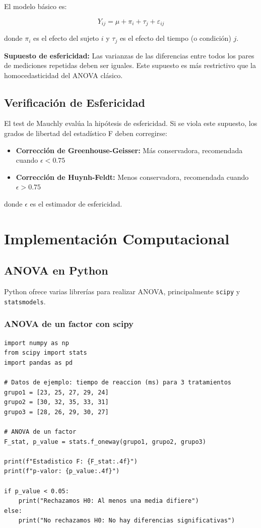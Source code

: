 \documentclass[11pt,a4paper]{article}
\theoremstyle{definition}
\begin{document}
El modelo básico es:

\begin{equation}
Y_{ij} = \mu + \pi_i + \tau_j + \varepsilon_{ij}
\end{equation}

donde $\pi_i$ es el efecto del sujeto $i$ y $\tau_j$ es el efecto del tiempo (o condición) $j$.

\textbf{Supuesto de esfericidad:} Las varianzas de las diferencias entre todos los pares de mediciones repetidas deben ser iguales. Este supuesto es más restrictivo que la homocedasticidad del ANOVA clásico.

\subsection{Verificación de Esfericidad}

El test de Mauchly evalúa la hipótesis de esfericidad. Si se viola este supuesto, los grados de libertad del estadístico F deben corregirse:

\begin{itemize}
    \item \textbf{Corrección de Greenhouse-Geisser:} Más conservadora, recomendada cuando $\epsilon < 0.75$
    \item \textbf{Corrección de Huynh-Feldt:} Menos conservadora, recomendada cuando $\epsilon > 0.75$
\end{itemize}

donde $\epsilon$ es el estimador de esfericidad.

\section{Implementación Computacional}

\subsection{ANOVA en Python}

Python ofrece varias librerías para realizar ANOVA, principalmente \texttt{scipy} y \texttt{statsmodels}.

\subsubsection{ANOVA de un factor con scipy}

\begin{lstlisting}[style=python, caption=ANOVA de un factor en Python]
import numpy as np
from scipy import stats
import pandas as pd

# Datos de ejemplo: tiempo de reaccion (ms) para 3 tratamientos
grupo1 = [23, 25, 27, 29, 24]
grupo2 = [30, 32, 35, 33, 31]
grupo3 = [28, 26, 29, 30, 27]

# ANOVA de un factor
F_stat, p_value = stats.f_oneway(grupo1, grupo2, grupo3)

print(f"Estadistico F: {F_stat:.4f}")
print(f"p-valor: {p_value:.4f}")

if p_value < 0.05:
    print("Rechazamos H0: Al menos una media difiere")
else:
    print("No rechazamos H0: No hay diferencias significativas")
\end{lstlisting}
\end{document}
